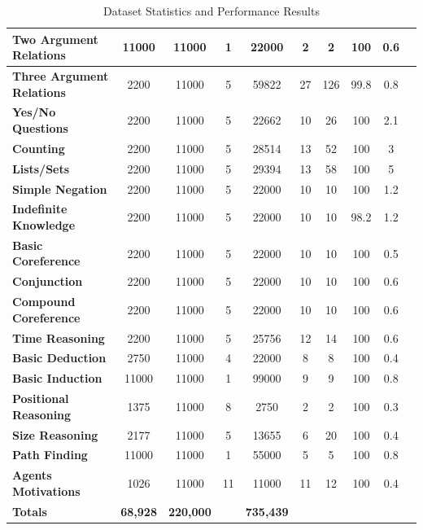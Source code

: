 \documentclass[letterpaper]{article}
\begin{document}
\begin{table}[b]
\begin{tabular}{|l||*{9}{c|}}
\textbf{\cellcolor{green!20}Two Argument Relations} & 11000 & 11000  & 1 & 22000 & 2 & 2 & 100 & 0.6\\\hline
\textbf{\cellcolor{green!20}Three Argument Relations} & 2200 & 11000 & 5 & 59822 & 27 & 126 & 99.8 & 0.8\\\hline
\textbf{\cellcolor{green!20}Yes/No Questions} & 2200 & 11000 & 5 & 22662 & 10 & 26 & 100 & 2.1\\\hline
\textbf{\cellcolor{green!20}Counting} & 2200 & 11000 & 5 & 28514 & 13 & 52 & 100 & 3\\\hline
\textbf{\cellcolor{green!20}Lists/Sets} & 2200 & 11000 & 5 & 29394 & 13 & 58 & 100 & 5\\\hline
\textbf{\cellcolor{green!20}Simple Negation}  & 2200 & 11000 & 5 & 22000 & 10 & 10 & 100 & 1.2\\\hline
\textbf{\cellcolor{green!20}Indefinite Knowledge} & 2200 & 11000 & 5 & 22000  & 10 & 10 & 98.2 & 1.2\\\hline
\textbf{\cellcolor{green!20}Basic Coreference} & 2200 & 11000 & 5 & 22000 & 10 & 10  & 100 & 0.5\\\hline
\textbf{\cellcolor{green!20}Conjunction} & 2200 & 11000  & 5 & 22000 & 10 & 10 & 100 & 0.6\\\hline
\textbf{\cellcolor{green!20}Compound Coreference} & 2200 & 11000 & 5 & 22000 & 10 & 10 & 100 & 0.6\\\hline
\textbf{\cellcolor{green!20}Time Reasoning} & 2200 & 11000  & 5 & 25756 & 12 & 14 & 100 & 0.6\\\hline
\textbf{\cellcolor{green!20}Basic Deduction} & 2750 & 11000 & 4 & 22000 & 8 & 8 & 100 & 0.4\\\hline
\textbf{\cellcolor{green!20}Basic Induction} & 11000 & 11000 & 1 & 99000 & 9 & 9 & 100 & 0.8\\\hline
\textbf{\cellcolor{green!20}Positional Reasoning} & 1375 & 11000 & 8 & 2750 & 2 & 2 & 100 & 0.3\\\hline
\textbf{\cellcolor{green!20}Size Reasoning} & 2177 & 11000 & 5 & 13655 & 6 & 20 & 100 & 0.4\\\hline
\textbf{\cellcolor{green!20}Path Finding} & 11000 & 11000 & 1 & 55000 & 5 & 5 & 100 & 0.8\\\hline
\textbf{\cellcolor{green!20}Agents Motivations} & 1026 & 11000 & 11 & 11000 & 11 & 12 & 100 & 0.4\\\hline
\textbf{\cellcolor{orange!20}\textbf{Totals}} & \textbf{68,928} & \textbf{220,000} &  & \textbf{735,439} &  &  &  & \\\hline
\end{tabular}
\vspace{0.02in}
\caption{Dataset Statistics and Performance Results}
\label{table:square_performance_result}
\end{table}
\end{document}
